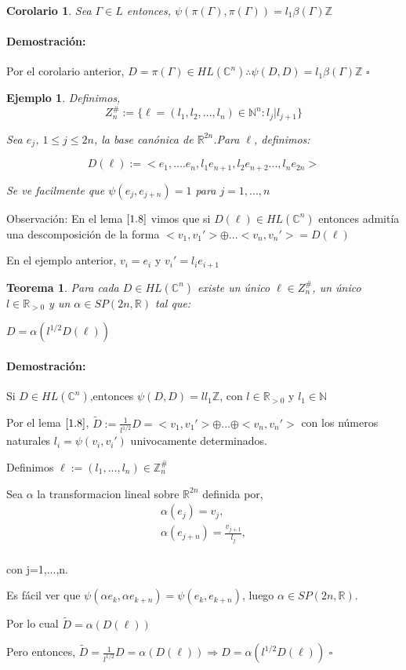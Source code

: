 \documentclass[12pt]{article}
\newtheorem{theorem}{Teorema}
\newtheorem{corollary}{Corolario}
\newtheorem{example}{Ejemplo}
\newenvironment{proof}{\paragraph{Demostración:}}{\hfill$\square$}
\begin{document}
 \begin{corollary}
  Sea $\Gamma  \in L$ entonces, $\psi(\pi(\Gamma),\pi(\Gamma))=l_1 \beta(\Gamma) \mathbb{Z}$  
 \end{corollary}
 \begin{proof}
  Por el corolario anterior, $D=\pi(\Gamma) \in HL(\mathbb{C}^n) \therefore \psi(D,D)=l_1 \beta(\Gamma) \mathbb{Z}$  
 \end{proof}


\begin{example} 
 Definimos,
 $$Z_n^{\#}:= \{ \ell=(l_1,l_2,...,l_n) \in \mathbb{N}^n:l_j|l_{j+1} \}$$
 
 Sea $e_j$, $1\leq j \leq 2n $,  la base canónica de $\mathbb{R}^{2n}$.Para $\ell$, definimos:
 
 $$D(\ell):=<e_1,....e_n,l_1 e_{n+1},l_2 e_{n+2}...,l_n e_{2n}>$$
  
 
 Se ve facilmente que $\psi(e_j,e_{j+n})=1$ para $j=1,...,n$
\end{example}

 Observación: En el lema $\ref{1.8}$ vimos que si $D(\ell) \in HL(\mathbb{C}^n)$ entonces admitía una descomposición de la forma 
 $<v_1,v_1'>\oplus ... <v_n,v_n'>= D(\ell)$
 
 En el ejemplo anterior, $v_i=e_i$ y $v_i'=l_i e_{i+1}$
 

\begin{theorem}
 Para cada $D \in HL(\mathbb{C}^n)$ existe un único $\ell \in Z_n^{\#}$, un único $l \in \mathbb{R}_{>0}$ y un $\alpha \in SP(2n,\mathbb{R})$ tal que:
 
 $D=\alpha(l^{1/2} D(\ell))$
\end{theorem}

\begin{proof}
 Si $D \in HL(\mathbb{C}^n)$,entonces $ \psi(D,D)=l l_1 \mathbb{Z}$, con $l \in \mathbb{R}_{>0}$ y $l_1 \in \mathbb{N}$ 
 
 Por el lema $\ref{1.8}$, $\tilde{D}:= \frac{1}{l^{1/2}} D =  <v_1,v_1'> \oplus...\oplus <v_n,v_n'>$
 con los números naturales $l_i=\psi(v_i,v_i')$ univocamente determinados.

 Definimos $\ell:=(l_1,...,l_n) \in \mathbb{Z}_n^{\#}$
 
  
 
 Sea $\alpha$ la transformacion lineal sobre $\mathbb{R}^{2n}$ definida por, 
 $$
 \begin{aligned}
 \alpha(e_j)=v_j,\\
 \alpha(e_{j+n})=\frac{v_{j+1}}{l_j},\\
 \end{aligned}$$
 
 con j=1,...,n.
 
 
Es fácil ver que $\psi(\alpha e_k,\alpha e_{k+n})=\psi(e_k,e_{k+n})$, luego $\alpha \in  SP(2n,\mathbb{R})$.

Por lo cual  $\tilde{D} = \alpha(D(\ell)) $

Pero entonces, $\tilde{D}=\frac{1}{l^{1/2}} D = \alpha(D(\ell)) \Rightarrow D=\alpha(l^{1/2} D(\ell))$
\end{proof}
\end{document}

